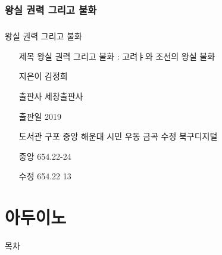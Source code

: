 \documentclass[aspectratio=1610,14pt,xcolor=pdftex,dvipsnames,table,handout]{beamer}
\begin{document}
		\section{ 왕실 권력 그리고 불화 }
		\begin{frame} [t,plain]
		\frametitle{}
			\begin{block} { 왕실 권력 그리고 불화 }
			\setlength{\leftmargini}{4em}			
			\begin{itemize}
				\item [제목]  	왕실 권력 그리고 불화  : 고려ㅑ와 조선의 왕실 불화
				\item [지은이]	김정희 
				\item [출판사]	세창출판사 
				\item [출판일]	2019

				\item [도서관]	구포 중앙 해운대 시민 우동 금곡 수정 북구디지털	
				\item [중앙]		654.22-24
				\item [수정]		654.22 13
			\end{itemize}
			\end{block}						
								
		\end{frame}						


		

		\part{ 아두이노 }
		\frame{\partpage}
		
		\begin{frame} [plain]{목차}
		\tableofcontents%
		\end{frame}
		





\end{document}
